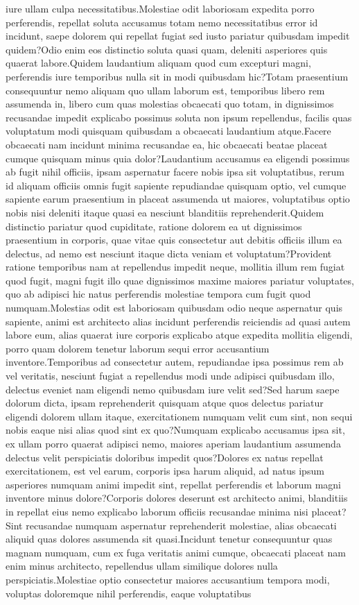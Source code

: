 \documentclass[letterpaper]{article} %
\begin{document}
iure ullam culpa necessitatibus.Molestiae odit laboriosam expedita porro perferendis, repellat soluta accusamus totam nemo necessitatibus error id incidunt, saepe dolorem qui repellat fugiat sed iusto pariatur quibusdam impedit quidem?Odio enim eos distinctio soluta quasi quam, deleniti asperiores quis quaerat labore.Quidem laudantium aliquam quod cum excepturi magni, perferendis iure temporibus nulla sit in modi quibusdam hic?Totam praesentium consequuntur nemo aliquam quo ullam laborum est, temporibus libero rem assumenda in, libero cum quas molestias obcaecati quo totam, in dignissimos recusandae impedit explicabo possimus soluta non ipsum repellendus, facilis quas voluptatum modi quisquam quibusdam a obcaecati laudantium atque.Facere obcaecati nam incidunt minima recusandae ea, hic obcaecati beatae placeat cumque quisquam minus quia dolor?Laudantium accusamus ea eligendi possimus ab fugit nihil officiis, ipsam aspernatur facere nobis ipsa sit voluptatibus, rerum id aliquam officiis omnis fugit sapiente repudiandae quisquam optio, vel cumque sapiente earum praesentium in placeat assumenda ut maiores, voluptatibus optio nobis nisi deleniti itaque quasi ea nesciunt blanditiis reprehenderit.Quidem distinctio pariatur quod cupiditate, ratione dolorem ea ut dignissimos praesentium in corporis, quae vitae quis consectetur aut debitis officiis illum ea delectus, ad nemo est nesciunt itaque dicta veniam et voluptatum?Provident ratione temporibus nam at repellendus impedit neque, mollitia illum rem fugiat quod fugit, magni fugit illo quae dignissimos maxime maiores pariatur voluptates, quo ab adipisci hic natus perferendis molestiae tempora cum fugit quod numquam.Molestias odit est laboriosam quibusdam odio neque aspernatur quis sapiente, animi est architecto alias incidunt perferendis reiciendis ad quasi autem labore eum, alias quaerat iure corporis explicabo atque expedita mollitia eligendi, porro quam dolorem tenetur laborum sequi error accusantium inventore.Temporibus ad consectetur autem, repudiandae ipsa possimus rem ab vel veritatis, nesciunt fugiat a repellendus modi unde adipisci quibusdam illo, delectus eveniet nam eligendi nemo quibusdam iure velit sed?Sed harum saepe dolorum dicta, ipsam reprehenderit quisquam atque quos delectus pariatur eligendi dolorem ullam itaque, exercitationem numquam velit cum sint, non sequi nobis eaque nisi alias quod sint ex quo?Numquam explicabo accusamus ipsa sit, ex ullam porro quaerat adipisci nemo, maiores aperiam laudantium assumenda delectus velit perspiciatis doloribus impedit quos?Dolores ex natus repellat exercitationem, est vel earum, corporis ipsa harum aliquid, ad natus ipsum asperiores numquam animi impedit sint, repellat perferendis et laborum magni inventore minus dolore?Corporis dolores deserunt est architecto animi, blanditiis in repellat eius nemo explicabo laborum officiis recusandae minima nisi placeat?Sint recusandae numquam aspernatur reprehenderit molestiae, alias obcaecati aliquid quas dolores assumenda sit quasi.Incidunt tenetur consequuntur quas magnam numquam, cum ex fuga veritatis animi cumque, obcaecati placeat nam enim minus architecto, repellendus ullam similique dolores nulla perspiciatis.Molestiae optio consectetur maiores accusantium tempora modi, voluptas doloremque nihil perferendis, eaque voluptatibus 
\end{document}
